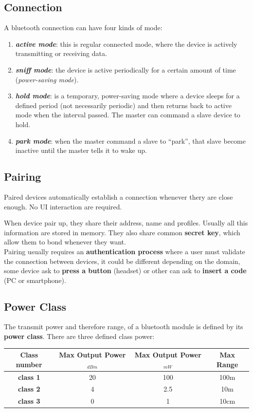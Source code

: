 \subsection{Connection}
A bluetooth connection can have four kinds of mode:
\begin{enumerate}[nosep]
    \item \textbf{\textit{active mode}}: this is regular connected mode, where the device is actively transmitting or receiving data.
    \item \textbf{\textit{sniff mode}}: the device is active periodically for a certain amount of time (\textit{power-saving mode}).
    \item \textbf{\textit{hold mode}}: is a temporary, power-saving mode where a device sleeps for a defined period (not necessarily periodic) and then returns back to active mode when the interval passed. The master can command a slave device to hold.
    \item \textbf{\textit{park mode}}: when the master command a slave to ``park'', that slave become inactive until the master tells it to wake up.
\end{enumerate}

\subsection{Pairing}
\begin{boxA}
    Paired devices automatically establish a connection whenever thery are close enough. No UI interaction are required.
\end{boxA}
When device pair up, they share their address, name and profiles. Usually all this information are stored in memory. They also share common \textbf{secret key}, which allow them to bond whenever they want. \\
Pairing usually requires an \textbf{authentication process} where a user must validate the connection between devices, it could be different depending on the domain, some device ask to \textbf{press a button} (headset) or other can ask to \textbf{insert a code} (PC or smartphone).

\newpage
\subsection{Power Class}
The transmit power and therefore range, of a bluetooth module is defined by its \textbf{power class}. There are three defined class power:
\begin{center}
    \begin{tabular}{ | c | c | c | c | } \hline
        \textbf{Class number} & \textbf{Max Output Power}$_{dBm}$ & \textbf{Max Output Power}$_{mW}$ & \textbf{Max Range} \\ \hline
        \textbf{class 1} & 20 & 100 & 100m \\ \hline
        \textbf{class 2} & 4 & 2.5 & 10m \\ \hline
        \textbf{class 3} & 0 & 1 & 10cm \\ \hline
    \end{tabular}
\end{center}


